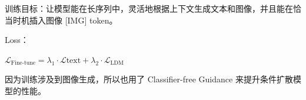 \documentclass[zihao=false,fontset=windows]{ctexart}
\newcommand{\bigmath}[1]{%
  \begin{center}\large$\displaystyle #1$\end{center}%
}
\begin{document}

训练目标：让模型能在长序列中，灵活地根据上下文生成文本和图像，并且能在恰当时机插入图像 [IMG] token。\par


Loss：\par\bigmath{\mathcal{L}_{\text{Fine-tune}}=\lambda_1\cdot\mathcal{L}\text{text}+\lambda_2\cdot\mathcal{L}_{\text{LDM}}}


因为训练涉及到图像生成，所以也用了 Classifier-free Guidance 来提升条件扩散模型的性能。\par
\end{document}
